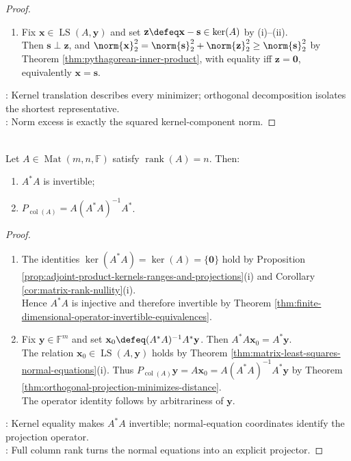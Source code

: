 \begin{proposition}
\begin{proof}
\begin{enumerate}[label=(\roman*)]
\item Fix $\mathbf{x}\in\operatorname{LS}(A,\mathbf{y})$ and set $\mathbf{z}\defeq\mathbf{x}-\mathbf{s}\in\ker(A)$ by (i)--(ii).\\
Then $\mathbf{s}\perp\mathbf{z}$, and $\norm{\mathbf{x}}_2^2=\norm{\mathbf{s}}_2^2+\norm{\mathbf{z}}_2^2\geq\norm{\mathbf{s}}_2^2$ by Theorem \ref{thm:pythagorean-inner-product}, with equality iff $\mathbf{z}=\mathbf{0}$, equivalently $\mathbf{x}=\mathbf{s}$.
\end{enumerate}
: Kernel translation describes every minimizer; orthogonal decomposition isolates the shortest representative.\\
: Norm excess is exactly the squared kernel-component norm.
\end{proof}
\end{proposition}

\begin{corollary} \label{cor:full-column-rank-projection-formula} \\
Let $A\in\operatorname{Mat}(m,n,\mathbb{F})$ satisfy $\operatorname{rank}(A)=n$. Then:
\begin{enumerate}[label=(\roman*)]
\setlength{\itemsep}{0pt}
\item $A^*A$ is invertible;
\item $P_{\operatorname{col}(A)}=A(A^*A)^{-1}A^*$.
\end{enumerate}
\begin{proof}
\begin{enumerate}[label=(\roman*)]
\setlength{\itemsep}{0pt}
\item The identities $\ker(A^*A)=\ker(A)=\{\mathbf{0}\}$ hold by Proposition \ref{prop:adjoint-product-kernels-ranges-and-projections}(i) and Corollary \ref{cor:matrix-rank-nullity}(i).\\
Hence $A^*A$ is injective and therefore invertible by Theorem \ref{thm:finite-dimensional-operator-invertible-equivalences}.
\item Fix $\mathbf{y}\in\mathbb{F}^m$ and set $\mathbf{x}_0\defeq(A^*A)^{-1}A^*\mathbf{y}$. Then $A^*A\mathbf{x}_0=A^*\mathbf{y}$.\\
The relation $\mathbf{x}_0\in\operatorname{LS}(A,\mathbf{y})$ holds by Theorem \ref{thm:matrix-least-squares-normal-equations}(i). Thus $P_{\operatorname{col}(A)}\mathbf{y}=A\mathbf{x}_0=A(A^*A)^{-1}A^*\mathbf{y}$ by Theorem \ref{thm:orthogonal-projection-minimizes-distance}.\\
The operator identity follows by arbitrariness of $\mathbf{y}$.
\end{enumerate}
: Kernel equality makes $A^*A$ invertible; normal-equation coordinates identify the projection operator.\\
: Full column rank turns the normal equations into an explicit projector.
\end{proof}
\end{corollary}

